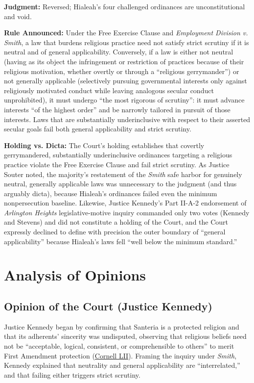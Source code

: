 \documentclass[12pt]{article}
\begin{document}
\textbf{Judgment:} Reversed; Hialeah's four challenged ordinances are unconstitutional and void.

\textbf{Rule Announced:} Under the Free Exercise Clause and \textit{Employment Division v. Smith}, a law that burdens religious practice need not satisfy strict scrutiny if it is neutral and of general applicability. Conversely, if a law is either not neutral (having as its object the infringement or restriction of practices because of their religious motivation, whether overtly or through a ``religious gerrymander'') or not generally applicable (selectively pursuing governmental interests only against religiously motivated conduct while leaving analogous secular conduct unprohibited), it must undergo ``the most rigorous of scrutiny'': it must advance interests ``of the highest order'' and be narrowly tailored in pursuit of those interests. Laws that are substantially underinclusive with respect to their asserted secular goals fail both general applicability and strict scrutiny.

\textbf{Holding vs. Dicta:} The Court's holding establishes that covertly gerrymandered, substantially underinclusive ordinances targeting a religious practice violate the Free Exercise Clause and fail strict scrutiny. As Justice Souter noted, the majority's restatement of the \textit{Smith} safe harbor for genuinely neutral, generally applicable laws was unnecessary to the judgment (and thus arguably dicta), because Hialeah's ordinances failed even the minimum nonpersecution baseline. Likewise, Justice Kennedy's Part II-A-2 endorsement of \textit{Arlington Heights} legislative-motive inquiry commanded only two votes (Kennedy and Stevens) and did not constitute a holding of the Court, and the Court expressly declined to define with precision the outer boundary of ``general applicability'' because Hialeah's laws fell ``well below the minimum standard.''

\section{Analysis of Opinions}

\subsection{Opinion of the Court (Justice Kennedy)}

Justice Kennedy began by confirming that Santeria is a protected religion and that its adherents' sincerity was undisputed, observing that religious beliefs need not be ``acceptable, logical, consistent, or comprehensible to others'' to merit First Amendment protection (\href{https://www.law.cornell.edu/supct/html/91-948.ZO.html}{Cornell LII}). Framing the inquiry under \textit{Smith}, Kennedy explained that neutrality and general applicability are ``interrelated,'' and that failing either triggers strict scrutiny.
\end{document}

